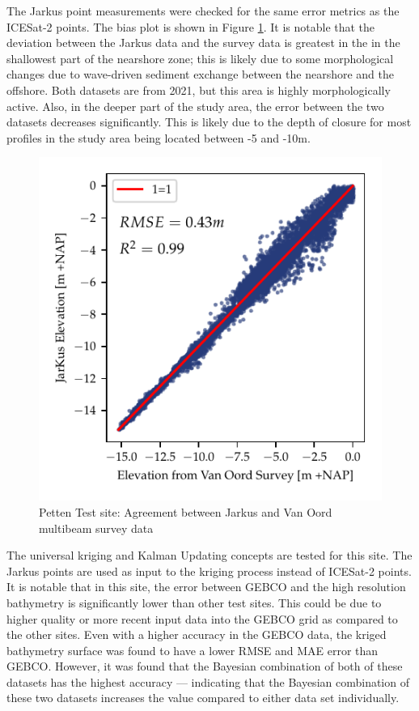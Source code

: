 The Jarkus point measurements were checked for the same error metrics as the ICESat-2 points. The bias plot is shown in Figure \ref{fig:petten-bias-plot}. It is notable that the deviation between the Jarkus data and the survey data is greatest in the in the shallowest part of the nearshore zone; this is likely due to some morphological changes due to wave-driven sediment exchange between the nearshore and the offshore. Both datasets are from 2021, but this area is highly morphologically active. Also, in the deeper part of the study area, the error  between the two datasets decreases significantly. This is likely due to the depth of closure for most profiles in the study area being located between -5 and -10m. 

\begin{figure}[h]
    \centering
    \includegraphics{figures/petten_lidar_estimated_vs_truth.pdf}
    \caption{Petten Test site: Agreement between Jarkus and Van Oord multibeam survey data}
    \label{fig:petten-bias-plot}
\end{figure}

The universal kriging and Kalman Updating concepts are tested for this site. The Jarkus points are used as input to the kriging process instead of ICESat-2 points. It is notable that in this site, the error between GEBCO and the high resolution bathymetry is significantly lower than other test sites. This could be due to higher quality or more recent input data into the GEBCO grid as compared to the other sites. Even with a higher accuracy in the GEBCO data, the kriged bathymetry surface was found to have a lower RMSE and MAE error than GEBCO. However, it was found that the Bayesian combination of both of these datasets has the highest accuracy --- indicating that the Bayesian combination of these two datasets increases the value compared to either data set individually. 

